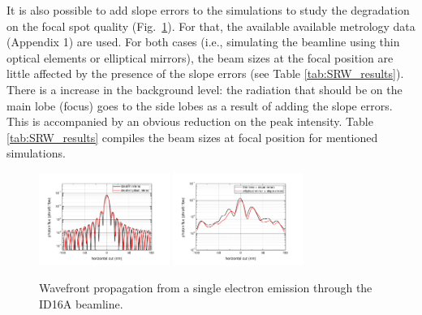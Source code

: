 \documentclass{iucr}              %
\begin{document}
It is also possible to add slope errors to the simulations to study the degradation on the focal spot quality (Fig.~\ref{fig:SingleElectron}). For that, the available available metrology data (Appendix 1) are used. For both cases (i.e., simulating the beamline using thin optical elements or elliptical mirrors), the beam sizes at the focal position are little affected by the presence of the slope errors (see Table \ref{tab:SRW_results}). There is a increase in the background level: the radiation that should be on the main lobe (focus) goes to the side lobes as a result of adding the slope errors. This is accompanied by an obvious reduction on the peak intensity. Table \ref{tab:SRW_results} compiles the beam sizes at focal position for mentioned simulations.

\begin{figure}
    \centering
        \includegraphics[width=4.25cm]{GRAPHICS/se_idealTE_idealOE_h.pdf}
        \includegraphics[width=4.25cm]{GRAPHICS/ebs_slopeTE_slopeOE_h.pdf}
    \label{fig:SingleElectron}
    \caption{Wavefront propagation from a single electron emission through the ID16A beamline. }
\end{figure}


\begin{table}\label{tab:SRW_results}
\centering
\caption{Beam dimensions (FWHM) at the focal position for different models of focusing elements.}
\end{table}
\end{document}

